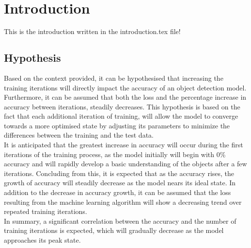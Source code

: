 \section{Introduction}
This is the introduction written in the introduction.tex file!


\subsection{Hypothesis}
Based on the context provided, it can be hypothesised that increasing the training iterations will directly impact the accuracy
of an object detection model. Furthermore, it can be assumed that both the loss and the percentage increase in accuracy between 
iterations, steadily decreases. This hypothesis is based on the fact that each additional iteration of training, will allow the model
to converge towards a more optimised state by adjusting its parameters to minimize the differences between the training and the test data.\\
It is anticipated that the greatest increase in accuracy will occur during the first iterations of the training process, as the
model initially will begin with 0\% accuracy and will rapidly develop a basic understanding of the objects after a few iterations. 
Concluding from this, it is expected that as the accuracy rises, the growth of accuracy will steadily decrease as the model nears its 
ideal state. In addition to the decrease in accuracy growth, it can be assumed that the loss resulting from the machine learning algorithm 
will show a decreasing trend over repeated training iterations.\\
In summary, a significant correlation between the accuracy and the number of training iterations is expected, which will gradually decrease as
the model approaches its peak state.


